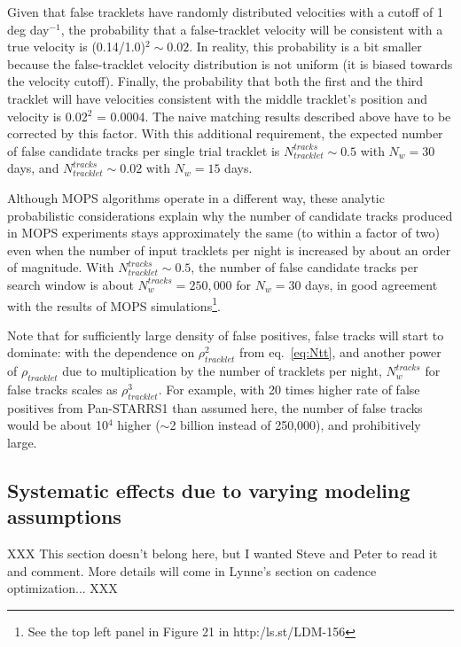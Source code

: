 Given that false tracklets have randomly distributed velocities with a cutoff of 1 deg day$^{-1}$,
the probability that a false-tracklet velocity will be consistent with a true velocity is 
(0.14/1.0)$^2 \sim 0.02$. In reality, this probability is a bit smaller because the false-tracklet
velocity distribution is not uniform (it is biased towards the velocity cutoff). Finally, 
the probability that both the first and the third tracklet will have velocities consistent with
the middle tracklet's position and velocity is 0.02$^2$ = 0.0004. The naive matching 
results described above have to be corrected by this factor.  With this additional requirement, 
the expected number of false candidate tracks per single trial tracklet is $N_{tracklet}^{tracks} \sim0.5$ 
with $N_w= 30$ days, and $N_{tracklet}^{tracks} \sim0.02$ with $N_w= 15$ days. 

Although MOPS algorithms operate in a different way, these analytic probabilistic considerations 
explain why the number of candidate tracks produced in MOPS experiments stays approximately
the same (to within a factor of two) even when the number of input tracklets per night is increased
by about an order of magnitude. With $N_{tracklet}^{tracks} \sim0.5$, the number of false candidate 
tracks per search window is about $N_{w}^{tracks} = 250,000$ for $N_w= 30$ days, in good
agreement with the results of MOPS simulations\footnote{See the top left panel 
in Figure 21 in http:/ls.st/LDM-156}. 


Note that for sufficiently large density of false positives,  false tracks will start to dominate: 
with the dependence on $\rho_{tracklet}^2$ from eq.~\ref{eq:Ntt}, and another power of 
$\rho_{tracklet}$ due to multiplication by the number of tracklets per night, $N_{w}^{tracks}$
for false tracks scales as $\rho_{tracklet}^3$. For example, with 20 times higher rate of 
false positives from Pan-STARRS1 than assumed here, the number of false tracks would
be about 10$^4$ higher ($\sim$2 billion instead of 250,000), and prohibitively large. 





\newpage 

\subsection{Systematic effects due to varying modeling assumptions}

XXX This section doesn't belong here, but I wanted Steve and Peter to read it and comment. 
More details will come in Lynne's section on cadence optimization... XXX



